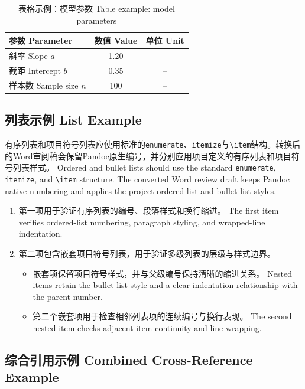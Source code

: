 \documentclass[12pt,a4paper]{article}
\begin{document}
\begin{table}[htbp]
  \centering
  \caption{表格示例：模型参数 Table example: model parameters}
  \label{tab:sample}
  \begin{tabular}{lcc}
    \toprule
    参数 Parameter & 数值 Value & 单位 Unit \\
    \midrule
    斜率 Slope $a$ & 1.20 & -- \\
    截距 Intercept $b$ & 0.35 & -- \\
    样本数 Sample size $n$ & 100 & -- \\
    \bottomrule
  \end{tabular}
\end{table}

\subsection{列表示例 List Example}
\label{subsec:list}

有序列表和项目符号列表应使用标准的\verb|enumerate|、\verb|itemize|与\verb|\item|结构。转换后的Word审阅稿会保留Pandoc原生编号，并分别应用项目定义的有序列表和项目符号列表样式。 Ordered and bullet lists should use the standard \verb|enumerate|, \verb|itemize|, and \verb|\item| structure. The converted Word review draft keeps Pandoc native numbering and applies the project ordered-list and bullet-list styles.

\begin{enumerate}
  \item 第一项用于验证有序列表的编号、段落样式和换行缩进。 The first item verifies ordered-list numbering, paragraph styling, and wrapped-line indentation.
  \item 第二项包含嵌套项目符号列表，用于验证多级列表的层级与样式边界。
    \begin{itemize}
      \item 嵌套项保留项目符号样式，并与父级编号保持清晰的缩进关系。 Nested items retain the bullet-list style and a clear indentation relationship with the parent number.
      \item 第二个嵌套项用于检查相邻列表项的连续编号与换行表现。 The second nested item checks adjacent-item continuity and line wrapping.
    \end{itemize}
\end{enumerate}

\subsection{综合引用示例 Combined Cross-Reference Example}
\label{subsec:cross-reference}
\end{document}
